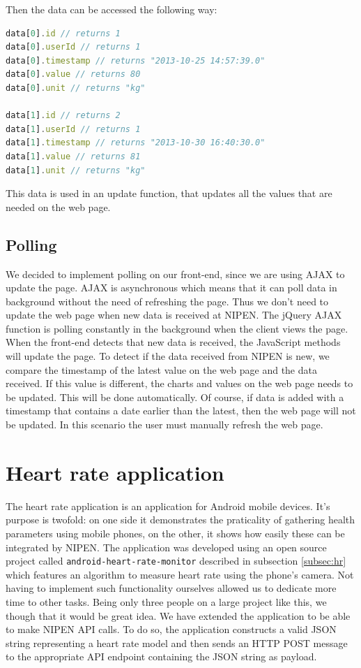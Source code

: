 Then the data can be accessed the following way:
\begin{lstlisting}[language=JavaScript]
data[0].id // returns 1
data[0].userId // returns 1
data[0].timestamp // returns "2013-10-25 14:57:39.0"
data[0].value // returns 80
data[0].unit // returns "kg"

data[1].id // returns 2
data[1].userId // returns 1
data[1].timestamp // returns "2013-10-30 16:40:30.0"
data[1].value // returns 81
data[1].unit // returns "kg"
\end{lstlisting}

This data is used in an update function, that updates all the values that are needed on the web page.

\subsection{Polling}

We decided to implement polling on our front-end, since we are using AJAX to update the page.
AJAX is asynchronous which means that it can poll data in background without the need of refreshing the page.
Thus we don't need to update the web page when new data is received at NIPEN.
The jQuery AJAX function is polling constantly in the background when the client views the page.
When the front-end detects that new data is received, the JavaScript methods will update the page.
To detect if the data received from NIPEN is new, we compare the timestamp of the latest value on the web page and the data received.
If this value is different, the charts and values on the web page needs to be updated.
This will be done automatically.
Of course, if data is added with a timestamp that contains a date earlier than the latest, then the web page 
will not be updated.
In this scenario the user must manually refresh the web page.

\section{Heart rate application}

The heart rate application is an application for Android mobile devices.
It's purpose is twofold: on one side it demonstrates the praticality of gathering health parameters using mobile phones,
on the other, it shows how easily these can be integrated by NIPEN. %
The application was developed using an open source project called \verb|android-heart-rate-monitor| described
in subsection \ref{subsec:hr} which features an algorithm to measure heart rate using the phone's camera.
Not having to implement such functionality ourselves allowed us to dedicate more time to other tasks.
Being only three people on a large project like this, we though that it would be great idea.
We have extended the application to be able to make NIPEN API calls.
To do so, the application constructs a valid JSON string representing a heart rate model and then
sends an HTTP POST message to the appropriate API endpoint containing the JSON string as payload.

